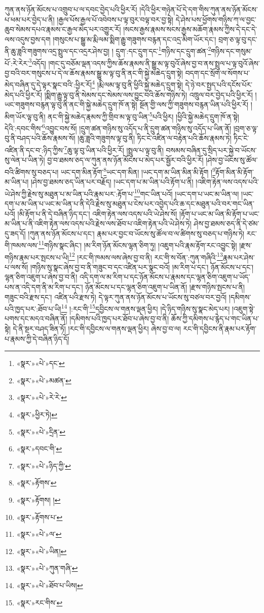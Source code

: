 ཀུན་ནས་ཉོན་མོངས་པ་འགྲུབ་པ་ལ་དབང་བྱེད་པའི་ཕྱིར་རོ། །དེའི་ཕྱིར་གཉེན་པོ་དེ་དག་གིས་ཀུན་ནས་ཉོན་མོངས་པ་ཕམ་པར་བྱེད་པ་ནི། །རྒྱལ་པོས་རྒྱལ་པོ་འབེབས་པ་ལྟ་བུར་བལྟ་བར་བྱ་སྟེ། དེ་ཤེས་པས་ཕྱོགས་གཉིས་ཀ་ལ་བྱང་ཆུབ་སེམས་དཔའ་རྣམས་ང་རྒྱལ་མེད་པར་འགྱུར་རོ། །སངས་རྒྱས་རྣམས་སངས་རྒྱས་མཆོག་རྣམས་ཀྱིས་དེ་དང་དེ་ལས་འདུས་བྱས་དག །གསུངས་པ་སྒྱུ་མ་རྨི་ལམ་སྨིག་རྒྱུ་གཟུགས་བརྙན་དང་འདྲ་མིག་ཡོར་དང་། བྲག་ཅ་ལྟ་བུ་དང་ནི་ཆུ་ཟླའི་གཟུགས་འདྲ་སྤྲུལ་དང་འདྲར་ཤེས་བྱ། །
དྲུག་:དང་དྲུག་དང་\footnote{«སྣར་»«པེ་»དང་}གཉིས་དང་དྲུག་ཚན་\footnote{«སྣར་»«པེ་»མཚན་}གཉིས་དང་གསུམ་པོ་:རེ་རེར་\footnote{«སྣར་»«པེ་»རེ་རེ་}འདོད། །གང་དུ་བཅོམ་ལྡན་འདས་ཀྱིས་ཆོས་རྣམས་ནི་སྒྱུ་མ་ལྟ་བུའོ་ཞེས་བྱ་བ་ནས་སྤྲུལ་པ་ལྟ་བུའོ་ཞེས་བྱ་བའི་བར་གསུངས་པ་དེ་ལ་ཆོས་རྣམས་སྒྱུ་མ་ལྟ་བུ་ནི་ནང་གི་སྐྱེ་མཆེད་དྲུག་སྟེ། བདག་དང་སྲོག་ལ་སོགས་པ་མེད་བཞིན་དུ་དེ་ལྟར་སྣང་བའི་:ཕྱིར་རོ།\footnote{«སྣར་»ཕྱིར་ཏེ།} །རྨི་ལམ་ལྟ་བུ་ནི་ཕྱིའི་སྐྱེ་མཆེད་དྲུག་སྟེ། དེ་ཉེ་བར་སྤྱད་པའི་དངོས་པོར་མེད་པའི་ཕྱིར་རོ། །སྨིག་རྒྱུ་ལྟ་བུ་ནི་སེམས་དང་སེམས་ལས་བྱུང་བའི་ཆོས་གཉིས་ཏེ། འཁྲུལ་བར་བྱེད་པའི་ཕྱིར་རོ། །ཡང་གཟུགས་བརྙན་ལྟ་བུ་ནི་ནང་གི་སྐྱེ་མཆེད་དྲུག་ཁོ་ན་སྟེ། སྔོན་གྱི་ལས་ཀྱི་གཟུགས་བརྙན་ཡིན་པའི་ཕྱིར་རོ། །མིག་ཡོར་ལྟ་བུ་ནི། ནང་གི་སྐྱེ་མཆེད་རྣམས་ཀྱི་གྲིབ་མ་ལྟ་བུ་ཡིན་\footnote{«སྣར་»«པེ་»དྲིན་}པའི་ཕྱིར། །ཕྱིའི་སྐྱེ་མཆེད་དྲུག་ཁོ་ན་སྟེ། དེའི་:དབང་གིས་\footnote{«སྣར་»དབང་གི་}འབྱུང་བས་སོ། །དྲུག་ཚན་གཉིས་སུ་འདོད་པ་ནི་དྲུག་ཚན་གཉིས་སུ་འདོད་པ་ཡིན་ནོ། །བྲག་ཅ་ལྟ་བུ་ནི་བཤད་པའི་ཆོས་རྣམས་སོ། །ཆུ་ཟླའི་གཟུགས་ལྟ་བུ་ནི། ཏིང་ངེ་འཛིན་ལ་བརྟེན་པའི་ཆོས་རྣམས་ཏེ། ཏིང་ངེ་འཛིན་ནི་དང་བ་:ཉིད་ཀྱིས་\footnote{«སྣར་»«པེ་»ཉིད་ཀྱི་}ཆུ་ལྟ་བུ་ཡིན་པའི་ཕྱིར་རོ། །སྤྲུལ་པ་ལྟ་བུ་ནི། བསམས་བཞིན་དུ་སྲིད་པར་སྐྱེ་བ་ཡོངས་སུ་ལེན་པ་ཡིན་ཏེ། བྱ་བ་ཐམས་ཅད་ལ་ཀུན་ནས་ཉོན་མོངས་པ་མེད་པར་སྦྱོར་བའི་ཕྱིར་རོ། །ཤེས་བྱ་ཡོངས་སུ་ཚོལ་བའི་ཚིགས་སུ་བཅད་པ། ཡང་དག་མིན་རྟོག་\footnote{«སྣར་»རྟོགས་}ཡང་དག་མིན། །ཡང་དག་མ་ཡིན་མིན་མི་རྟོག །\footnote{«སྣར་»རྟོགས། །}རྟོག་མིན་མི་རྟོག་མ་ཡིན་པ། །ཤེས་བྱ་ཐམས་ཅད་ཡིན་པར་བརྗོད། །ཡང་དག་པ་མ་ཡིན་པའི་རྟོག་པ་ནི། །འཇིག་རྟེན་ལས་འདས་པའི་ཡེ་ཤེས་ཀྱི་རྗེས་སུ་མཐུན་པ་མ་ཡིན་པའི་རྣམ་པར་:རྟོག་པ་\footnote{«སྣར་»རྟོགས་པ་}གང་ཡིན་པའོ། །ཡང་དག་པ་ཡང་མ་ཡིན་ལ། །ཡང་དག་པ་མ་ཡིན་པ་ཡང་མ་ཡིན་པ་ནི་དེའི་རྗེས་སུ་མཐུན་པ་ངེས་པར་འབྱེད་པའི་ཆ་དང་མཐུན་པའི་བར་གང་ཡིན་པའོ། །མི་རྟོག་པ་ནི་དེ་བཞིན་ཉིད་དང་། འཇིག་རྟེན་ལས་འདས་པའི་ཡེ་ཤེས་སོ། །རྟོག་པ་ཡང་མ་ཡིན་མི་རྟོག་པ་ཡང་མ་ཡིན་པ་ནི་འཇིག་རྟེན་ལས་འདས་པའི་རྗེས་ལས་ཐོབ་པ་འཇིག་རྟེན་པའི་ཡེ་ཤེས་ཏེ། ཤེས་བྱ་ཐམས་ཅད་ནི་དེ་ཙམ་དུ་ཟད་དོ། །ཀུན་ནས་ཉོན་མོངས་པ་དང་། རྣམ་པར་བྱང་བ་ཡོངས་སུ་ཚོལ་བ་ལ་ཚིགས་སུ་བཅད་པ་གཉིས་ཏེ། རང་གི་ཁམས་ལས་\footnote{«སྣར་»«པེ་»ལ་}གཉིས་སྣང་ཞིང་། །མ་རིག་ཉོན་མོངས་ལྷན་ཅིག་ཏུ། །འཇུག་པའི་རྣམ་རྟོག་རང་འབྱུང་སྟེ། །རྫས་གཉིས་རྣམ་པར་སྤངས་པ་ཡི།\footnote{«སྣར་»«པེ་»ཡིན།} །རང་གི་ཁམས་ལས་ཞེས་བྱ་བ་ནི། རང་གི་ས་བོན་:ཀུན་གཞིའི་\footnote{«སྣར་»«པེ་»ཀུན་གཞི་}རྣམ་པར་ཤེས་པ་ལས་སོ། །གཉིས་སུ་སྣང་ཞེས་བྱ་བ་ནི་གཟུང་བ་དང་འཛིན་པར་སྣང་བའོ། །མ་རིག་པ་དང་། ཉོན་མོངས་པ་དང་། ལྷན་ཅིག་འཇུག་པ་ཞེས་བྱ་བ་ནི། འདི་དག་ལ་མ་རིག་པ་དང་ཉོན་མོངས་པ་རྣམས་དང་ལྷན་ཅིག་འཇུག་པ་ཡོད་པས་ན་འདི་དག་ནི་མ་རིག་པ་དང་། ཉོན་མོངས་པ་དང་ལྷན་ཅིག་འཇུག་པ་ཡིན་ནོ། །རྫས་གཉིས་སྤངས་པ་ནི། གཟུང་བའི་རྫས་དང་། འཛིན་པའི་རྫས་ཏེ། དེ་ལྟར་ཀུན་ནས་ཉོན་མོངས་པ་ཡོངས་སུ་བཙལ་བར་བྱའོ། །དམིགས་པའི་ཁྱད་པར་:ཐོབ་པ་ཡི།\footnote{«སྣར་»«པེ་»ཐོབ་པ་ཡིས།} །:རང་གི་\footnote{«སྣར་»རང་གིས་}དབྱིངས་ལ་གནས་ལྡན་ཕྱིར། །དེ་ཉིད་གཉིས་སུ་སྣང་མེད་པར། །འཇུག་སྟེ་པགས་དང་མདའ་བཞིན་ནོ། །དམིགས་པའི་ཁྱད་པར་ཐོབ་པ་ཞེས་བྱ་བ་ནི། ཆོས་ཀྱི་དམིགས་པ་རྙེད་པ་གང་ཡིན་པ་སྟེ། དེ་ནི་སྔར་བཤད་ཟིན་ཏོ། །རང་གི་དབྱིངས་ལ་གནས་ལྡན་ཕྱིར། ཞེས་བྱ་བ་ལ། རང་གི་དབྱིངས་ནི་རྣམ་པར་རྟོག་པ་རྣམས་ཀྱི་དེ་བཞིན་ཉིད་དོ། 
